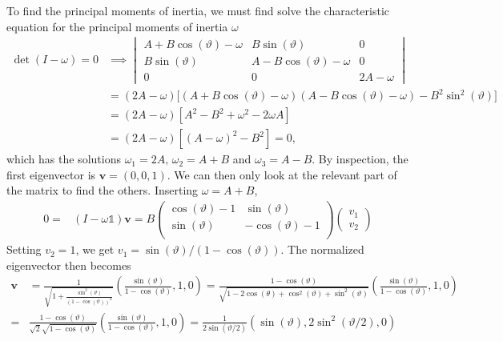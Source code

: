 \documentclass{article}
\begin{document}
        To find the principal moments of inertia, we must find solve the characteristic equation for the principal moments of inertia $\omega$
        \begin{align*}
             \det(I - \omega) = 0& \implies
            \begin{vmatrix*}
                A + B\cos(\vartheta) - \omega & B \sin(\vartheta) & 0 \\
                B \sin(\vartheta) & A - B\cos(\vartheta) - \omega & 0 \\
                0 & 0 & 2A - \omega
            \end{vmatrix*} \\
            &= (2A - \omega) \big[(A + B\cos(\vartheta) - \omega) (A - B\cos(\vartheta) - \omega)  - B^2 \sin^2(\vartheta) \big]  \\
            &= (2A - \omega)[A^2 - B^2 + \omega^2 - 2\omega A] \\
            &= (2A - \omega)[(A - \omega)^2 - B^2] = 0,
        \end{align*}
        which has the solutions $\omega_1 = 2A, \, \omega_2 = A+B$ and $\omega_3 = A-B$. By inspection, the first eigenvector is $\mathbf{v} = (0, 0, 1)$. We can then only look at the relevant part of the matrix to find the others. Inserting $\omega = A + B $,
        \begin{align*}
            0 = & (I - \omega \mathbb{1}) \mathbf{v} = B
            \begin{pmatrix*}
                \cos(\vartheta) - 1 & \sin(\vartheta)  \\
                \sin(\vartheta) & -\cos(\vartheta)-1  \\
            \end{pmatrix*} 
            \begin{pmatrix*}
                v_1 \\
                v_2 
            \end{pmatrix*}
        \end{align*}
        Setting $v_2 = 1$, we get $v_1 = \sin(\vartheta) / (1 - \cos(\vartheta))$. The normalized eigenvector then becomes
        \begin{align*}
            \mathbf{v} &= \frac{1}{\sqrt{1 + \frac{\sin^2(\vartheta)}{(1 - \cos(\vartheta))^2}}} \left( \frac{\sin(\vartheta)}{1 - \cos(\vartheta)}, 1, 0 \right)
            = \frac{1 - \cos(\vartheta)}{\sqrt{1 - 2 \cos(\theta) + \cos^2(\vartheta)  + \sin^2(\vartheta)}}\left( \frac{\sin(\vartheta)}{1 - \cos(\vartheta)}, 1, 0 \right) \\
            = &\frac{1 - \cos(\vartheta)}{\sqrt 2 \sqrt{1 - \cos(\vartheta) } }\left( \frac{\sin(\vartheta)}{1 - \cos(\vartheta)}, 1, 0 \right) 
            = \frac{1}{2  \sin(\vartheta/2) }\left( \sin(\vartheta), 2\sin^2(\vartheta / 2), 0 \right) 
        \end{align*}
\end{document}
